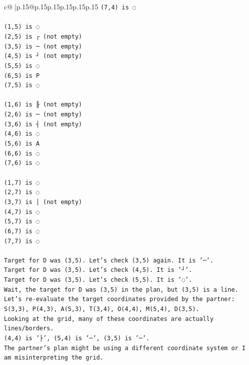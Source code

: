 \documentclass{article}
\begin{document}
{\begin{supertabular}{c@{$\;$}|p{.15\linewidth}@{}p{.15\linewidth}p{.15\linewidth}p{.15\linewidth}p{.15\linewidth}p{.15\linewidth}}
{{{\texttt{(7,4) is ◌} \\
\\ 
\texttt{(1,5) is ◌} \\
\texttt{(2,5) is ┌ (not empty)} \\
\texttt{(3,5) is ─ (not empty)} \\
\texttt{(4,5) is ┘ (not empty)} \\
\texttt{(5,5) is ◌} \\
\texttt{(6,5) is P} \\
\texttt{(7,5) is ◌} \\
\\ 
\texttt{(1,6) is ╟ (not empty)} \\
\texttt{(2,6) is ─ (not empty)} \\
\texttt{(3,6) is ┤ (not empty)} \\
\texttt{(4,6) is ◌} \\
\texttt{(5,6) is A} \\
\texttt{(6,6) is ◌} \\
\texttt{(7,6) is ◌} \\
\\ 
\texttt{(1,7) is ◌} \\
\texttt{(2,7) is ◌} \\
\texttt{(3,7) is │ (not empty)} \\
\texttt{(4,7) is ◌} \\
\texttt{(5,7) is ◌} \\
\texttt{(6,7) is ◌} \\
\texttt{(7,7) is ◌} \\
\\ 
\texttt{Target for D was (3,5). Let's check (3,5) again. It is '─'.} \\
\texttt{Target for D was (3,5). Let's check (4,5). It is '┘'.} \\
\texttt{Target for D was (3,5). Let's check (5,5). It is '◌'.} \\
\texttt{Wait, the target for D was (3,5) in the plan, but (3,5) is a line.} \\
\texttt{Let's re{-}evaluate the target coordinates provided by the partner:} \\
\texttt{S(3,3), P(4,3), A(5,3), T(3,4), O(4,4), M(5,4), D(3,5).} \\
\texttt{Looking at the grid, many of these coordinates are actually lines/borders.} \\
\texttt{(4,4) is '├', (5,4) is '─', (3,5) is '─'.} \\
\texttt{The partner's plan might be using a different coordinate system or I am misinterpreting the grid.} \\
}}}
\end{supertabular}}
\end{document}
